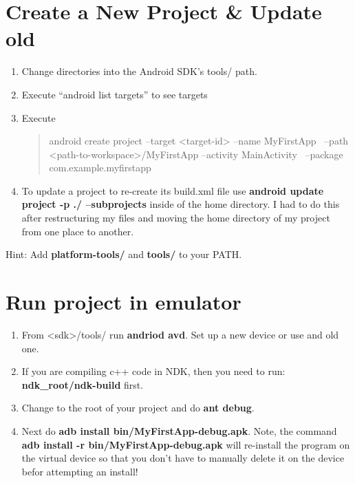 \documentclass[english]{article}
\begin{document}
\section*{Create a New Project \& Update old}
\begin{enumerate}
\item
Change directories into the Android SDK's tools/ path.
\item
Execute ``android list targets'' to see targets
\item
Execute
\begin{quote}
android create project --target <target-id> --name MyFirstApp \
--path <path-to-workspace>/MyFirstApp --activity MainActivity \
--package com.example.myfirstapp
\end{quote}
\item
To update a project to re-create its build.xml file use \textbf{android update project -p ./ --subprojects} inside of the home directory. I had to do this after restructuring my files and moving the home directory of my project from one place to another.
\end{enumerate}
Hint: Add \textbf{platform-tools/} and \textbf{tools/} to your PATH.


\section*{Run project in emulator}
\begin{enumerate}
\item
From <sdk>/tools/ run \textbf{andriod avd}. Set up a new device or use and old one.
\item
If you are compiling c++ code in NDK, then you need to run: \textbf{ndk\_root/ndk-build} first.
\item
Change to the root of your project and do \textbf{ant debug}.
\item
Next do \textbf{adb install bin/MyFirstApp-debug.apk}. Note, the command \textbf{adb install -r bin/MyFirstApp-debug.apk} will re-install the program on the virtual device so that you don't have to manually delete it on the device befor attempting an install!
\end{enumerate}
\end{document}
